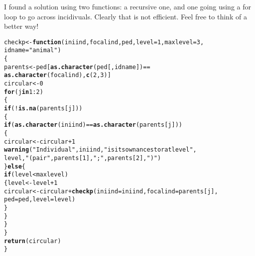 \documentclass[12pt,a4paper]{scrartcl}\usepackage[]{graphicx}\usepackage[]{color}
\makeatletter
\newcommand{\hlnum}[1]{\textcolor[rgb]{0.686,0.059,0.569}{#1}}%
\newcommand{\hlstr}[1]{\textcolor[rgb]{0.192,0.494,0.8}{#1}}%
\newcommand{\hlopt}[1]{\textcolor[rgb]{0,0,0}{#1}}%
\newcommand{\hlstd}[1]{\textcolor[rgb]{0.345,0.345,0.345}{#1}}%
\newcommand{\hlkwa}[1]{\textcolor[rgb]{0.161,0.373,0.58}{\textbf{#1}}}%
\newcommand{\hlkwb}[1]{\textcolor[rgb]{0.69,0.353,0.396}{#1}}%
\newcommand{\hlkwc}[1]{\textcolor[rgb]{0.333,0.667,0.333}{#1}}%
\newcommand{\hlkwd}[1]{\textcolor[rgb]{0.737,0.353,0.396}{\textbf{#1}}}%
\newenvironment{kframe}{%
 \def\at@end@of@kframe{}%
 \ifinner\ifhmode%
  \def\at@end@of@kframe{\end{minipage}}%
  \begin{minipage}{\columnwidth}%
 \fi\fi%
 \def\FrameCommand##1{\hskip\@totalleftmargin \hskip-\fboxsep
 \colorbox{shadecolor}{##1}\hskip-\fboxsep
     \hskip-\linewidth \hskip-\@totalleftmargin \hskip\columnwidth}%
 \MakeFramed {\advance\hsize-\width
   \@totalleftmargin\z@ \linewidth\hsize
   \@setminipage}}%
 {\par\unskip\endMakeFramed%
 \at@end@of@kframe}
\newenvironment{knitrout}{}{} %
\makeatother
\begin{document}
\begin{Answer}
I found a solution using two functions: a recursive one, and one going using a for loop to go across incidivuals. Clearly that is not efficient. Feel free to think of a better way!

\begin{knitrout}
\color{fgcolor}\begin{kframe}
\begin{alltt}
\hlstd{checkp} \hlkwb{<-} \hlkwa{function}\hlstd{(}\hlkwc{iniind}\hlstd{,} \hlkwc{focalind}\hlstd{,} \hlkwc{ped}\hlstd{,} \hlkwc{level}\hlstd{=}\hlnum{1}\hlstd{,} \hlkwc{maxlevel}\hlstd{=}\hlnum{3}\hlstd{,}
                   \hlkwc{idname} \hlstd{=} \hlstr{"animal"}\hlstd{)}
\hlstd{\{}
  \hlstd{parents} \hlkwb{<-} \hlstd{ped[}\hlkwd{as.character}\hlstd{(ped[,idname])}\hlopt{==}
                   \hlkwd{as.character}\hlstd{(focalind),}\hlkwd{c}\hlstd{(}\hlnum{2}\hlstd{,}\hlnum{3}\hlstd{)]}
  \hlstd{circular} \hlkwb{<-} \hlnum{0}
  \hlkwa{for}\hlstd{(j} \hlkwa{in} \hlnum{1}\hlopt{:}\hlnum{2}\hlstd{)}
  \hlstd{\{}
    \hlkwa{if}\hlstd{(}\hlopt{!}\hlkwd{is.na}\hlstd{(parents[j]))}
    \hlstd{\{}
      \hlkwa{if}\hlstd{(}\hlkwd{as.character}\hlstd{(iniind)}\hlopt{==}\hlkwd{as.character}\hlstd{(parents[j]))}
      \hlstd{\{}
        \hlstd{circular} \hlkwb{<-} \hlstd{circular}\hlopt{+}\hlnum{1}
        \hlkwd{warning}\hlstd{(}\hlstr{"Individual"}\hlstd{, iniind,} \hlstr{" is its own ancestor at level "}\hlstd{,}
                \hlstd{level,}  \hlstr{" (pair "}\hlstd{, parents[}\hlnum{1}\hlstd{],}\hlstr{";"}\hlstd{, parents[}\hlnum{2}\hlstd{],} \hlstr{")"}\hlstd{)}
      \hlstd{\}}\hlkwa{else}\hlstd{\{}
        \hlkwa{if}\hlstd{(level}\hlopt{<}\hlstd{maxlevel)}
        \hlstd{\{level} \hlkwb{<-} \hlstd{level}\hlopt{+}\hlnum{1}
        \hlstd{circular} \hlkwb{<-} \hlstd{circular} \hlopt{+} \hlkwd{checkp}\hlstd{(}\hlkwc{iniind}\hlstd{=iniind,} \hlkwc{focalind}\hlstd{=parents[j],}
                                      \hlkwc{ped} \hlstd{= ped,} \hlkwc{level}\hlstd{=level)}
        \hlstd{\}}
      \hlstd{\}}
    \hlstd{\}}
  \hlstd{\}}
  \hlkwd{return}\hlstd{(circular)}
\hlstd{\}}
\end{alltt}
\end{kframe}
\end{knitrout}


\end{Answer}
\end{document}
